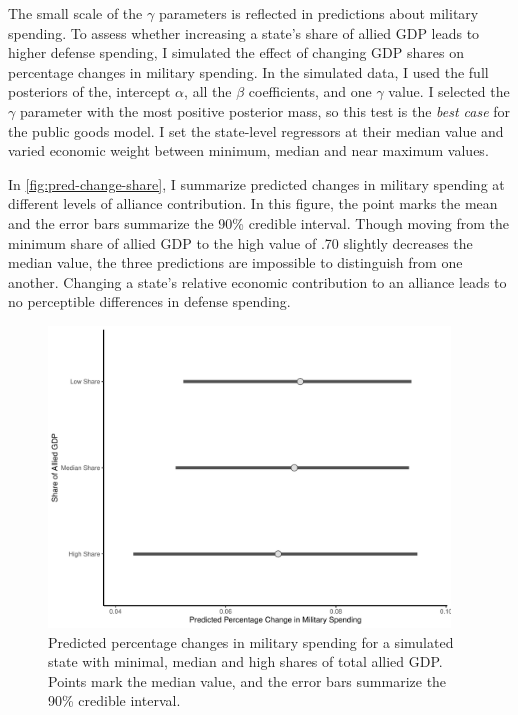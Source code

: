 \documentclass[12pt]{article}
\begin{document}
The small scale of the $\gamma$ parameters is reflected in predictions about military spending. 
To assess whether increasing a state's share of allied GDP leads to higher defense spending, I simulated the effect of changing GDP shares on percentage changes in military spending. 
In the simulated data, I used the full posteriors of the, intercept $\alpha$, all the $\beta$ coefficients, and one $\gamma$ value. 
I selected the $\gamma$ parameter with the most positive posterior mass, so this test is the \emph{best case} for the public goods model. 
I set the state-level regressors at their median value and varied economic weight between minimum, median and near maximum values. 


In \autoref{fig:pred-change-share}, I summarize predicted changes in military spending at different levels of alliance contribution. 
In this figure, the point marks the mean and the error bars summarize the 90\% credible interval. 
Though moving from the minimum share of allied GDP to the high value of .70 slightly decreases the median value, the three predictions are impossible to distinguish from one another. 
Changing a state's relative economic contribution to an alliance leads to no perceptible differences in defense spending. 

\begin{figure}[htbp]
	\centering
		\includegraphics[width=0.95\textwidth]{pred-change-share.pdf}
	\caption{Predicted percentage changes in military spending for a simulated state with minimal, median and high shares of total allied GDP. Points mark the median value, and the error bars summarize the 90\% credible interval.}
	\label{fig:pred-change-share}
\end{figure}
\end{document}
